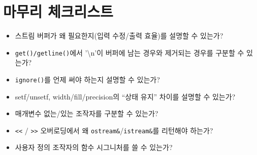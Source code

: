 \documentclass[11pt,a4paper]{article}
\begin{document}
\section*{마무리 체크리스트}
\begin{GoalBox}
\begin{itemize}[leftmargin=18pt]
  \item 스트림 버퍼가 왜 필요한지(입력 수정/출력 효율)를 설명할 수 있는가? %
  \item \texttt{get()/getline()}에서 '\textbackslash n'이 버퍼에 남는 경우와 제거되는 경우를 구분할 수 있는가? %
  \item \texttt{ignore()}를 언제 써야 하는지 설명할 수 있는가? %
  \item setf/unsetf, width/fill/precision의 ``상태 유지'' 차이를 설명할 수 있는가? %
  \item 매개변수 없는/있는 조작자를 구분할 수 있는가? %
  \item \texttt{<<} / \texttt{>>} 오버로딩에서 왜 \texttt{ostream\&}/\texttt{istream\&}를 리턴해야 하는가? %
  \item 사용자 정의 조작자의 함수 시그니처를 쓸 수 있는가? %
\end{itemize}
\end{GoalBox}
\end{document}
